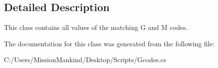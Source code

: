 \subsection{Detailed Description}
This class contains all values of the matching G and M codes. 



The documentation for this class was generated from the following file\+:\begin{DoxyCompactItemize}
\item 
C\+:/\+Users/\+Mission\+Mankind/\+Desktop/\+Scripts/Gcodes.\+cs\end{DoxyCompactItemize}
